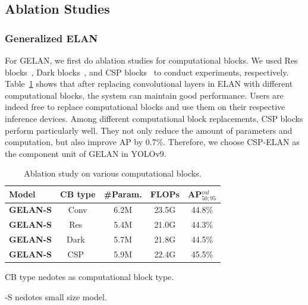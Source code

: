 \documentclass[10pt,twocolumn,letterpaper]{article}
\begin{document}
	\subsection{Ablation Studies}
	\label{sec:abl}
	
	\subsubsection{Generalized ELAN}
	
	For GELAN, we first do ablation studies for computational blocks.  We used Res blocks~\cite{he2016deep}, Dark blocks~\cite{redmon2018yolov3}, and CSP blocks~\cite{wang2020cspnet} to conduct experiments, respectively.  Table~\ref{table:cb} shows that after replacing convolutional layers in ELAN with different computational blocks, the system can maintain good performance.  Users are indeed free to replace computational blocks and use them on their respective inference devices.  Among different computational block replacements, CSP blocks perform particularly well.  They not only reduce the amount of parameters and computation, but also improve AP by 0.7\%.  Therefore, we choose CSP-ELAN as the component unit of GELAN in YOLOv9.
	
	\begin{table}[h]
		\centering
		\begin{threeparttable}[h]
			\footnotesize
			\caption{Ablation study on various computational blocks.}
			\label{table:cb}
			\begin{tabular}{lcccc}
				\toprule
				\textbf{Model} & \textbf{CB type} & \textbf{\#Param.} & \textbf{FLOPs} & \textbf{AP$^{val}_{50:95}$} \\	
				\midrule
				\textbf{GELAN-S} & Conv & 6.2M & 23.5G & 44.8\% \\
				\textbf{GELAN-S} & Res~\cite{he2016deep} & 5.4M & 21.0G & 44.3\% \\
				\textbf{GELAN-S} & Dark~\cite{redmon2018yolov3} & 5.7M & 21.8G & 44.5\% \\
				\textbf{GELAN-S} & CSP~\cite{wang2020cspnet} & 5.9M & 22.4G & 45.5\% \\
				\bottomrule
			\end{tabular}
			\begin{tablenotes}[flushleft]
			\footnotesize
			\item[1] CB type nedotes as computational block type.
			\item[2] -S nedotes small size model.
			\end{tablenotes}
		\end{threeparttable}
	\end{table}
\end{document}
